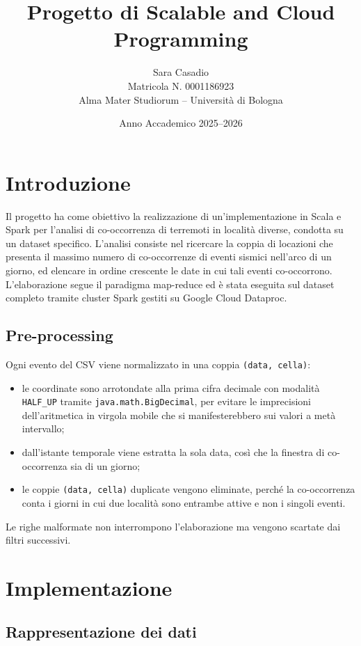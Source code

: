\documentclass[11pt,a4paper]{article}
\title{\vspace{-1.5cm}Progetto di Scalable and Cloud Programming}
\author{Sara Casadio \\ \small Matricola N. 0001186923 \\ \small Alma Mater Studiorum -- Università di Bologna}
\date{\small Anno Accademico 2025--2026}
\begin{document}
\maketitle
\vspace{-0.8cm}

\section{Introduzione}
Il progetto ha come obiettivo la realizzazione di un'implementazione in Scala e Spark per l'analisi di co-occorrenza di terremoti in località diverse, condotta su un dataset specifico. 
L'analisi consiste nel ricercare la coppia di locazioni che presenta il massimo numero di co-occorrenze di eventi sismici nell'arco di un giorno, ed elencare in ordine crescente le date in cui tali eventi co-occorrono.
L'elaborazione segue il paradigma map-reduce ed è stata eseguita sul dataset completo tramite
cluster Spark gestiti su Google Cloud Dataproc.

\subsection{Pre-processing}

Ogni evento del CSV viene normalizzato in una coppia \texttt{(data, cella)}:

\begin{itemize}
  \item le coordinate sono arrotondate alla prima cifra decimale con modalità \texttt{HALF\_UP}
        tramite \texttt{java.math.BigDecimal}, per evitare le imprecisioni dell'aritmetica
        in virgola mobile che si manifesterebbero sui valori a metà intervallo;
  \item dall'istante temporale viene estratta la sola data, così che la finestra di
        co-occorrenza sia di un giorno;
  \item le coppie \texttt{(data, cella)} duplicate vengono eliminate, perché la co-occorrenza
        conta i giorni in cui due località sono entrambe attive e non i singoli eventi.
\end{itemize}

Le righe malformate non interrompono l'elaborazione ma vengono scartate dai filtri successivi.

\section{Implementazione}

\subsection{Rappresentazione dei dati}
\end{document}

